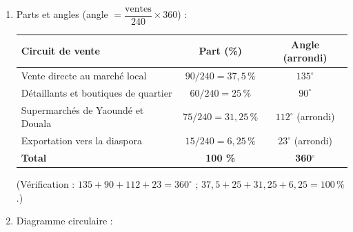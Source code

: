\documentclass[11pt]{article}
\begin{document}
\begin{corrige}
\begin{enumerate}
\item Parts et angles (angle $= \dfrac{\text{ventes}}{240} \times 360$) :
\begin{center}
\begin{tabularx}{\linewidth}{|X|c|c|}
\hline
\rowcolor{popblueL} Circuit de vente & Part (\%) & Angle (arrondi) \\
\hline
Vente directe au marché local & $90/240 = 37,5\,\%$ & $135^{\circ}$ \\
\hline
Détaillants et boutiques de quartier & $60/240 = 25\,\%$ & $90^{\circ}$ \\
\hline
Supermarchés de Yaoundé et Douala & $75/240 = 31,25\,\%$ & $112^{\circ}$ (arrondi) \\
\hline
Exportation vers la diaspora & $15/240 = 6,25\,\%$ & $23^{\circ}$ (arrondi) \\
\hline
\textbf{Total} & \textbf{100 \%} & \textbf{360$^{\circ}$} \\
\hline
\end{tabularx}
\end{center}
(Vérification : $135 + 90 + 112 + 23 = 360^{\circ}$ ; $37,5 + 25 + 31,25 + 6,25 = 100\,\%$.)

\item Diagramme circulaire :


\end{enumerate}
\end{corrige}
\end{document}
